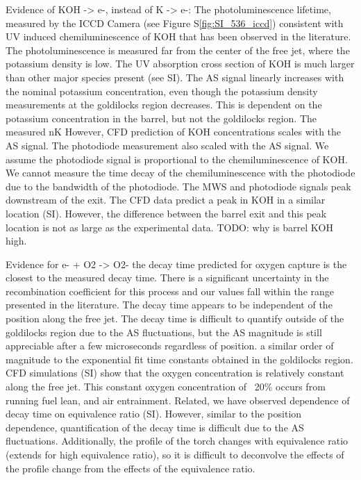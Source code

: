 \begin{outline}
\1 Evidence of KOH -> e-, instead of K -> e-:
    \2 The photoluminescence lifetime, measured by the ICCD Camera (see Figure S\ref*{fig:SI_536_iccd}) consistent with UV induced chemiluminescence of KOH that has been observed in the literature. The photoluminescence is measured far from the center of the free jet, where the potassium density is low.
    \2 The UV absorption cross section of KOH is much larger than other major species present (see SI).
    \2 The AS signal linearly increases with the nominal potassium concentration, even though the potassium density measurements at the goldilocks region decreases. This   is dependent on the potassium concentration in the barrel, but not the goldilocks region. The measured nK However, CFD prediction of KOH concentrations scales with the AS signal. The photodiode measurement also scaled with the AS signal. We assume the photodiode signal is proportional to the chemiluminescence of KOH. We cannot measure the time decay of the chemiluminescence with the photodiode due to the bandwidth of the photodiode.
    \2 The MWS and photodiode signals peak downstream of the exit. The CFD data predict a peak in KOH in a similar location (SI). However, the difference between the barrel exit and this peak location is not as large as the experimental data. TODO: why is barrel KOH high. 

\1 Evidence for e- + O2 -> O2-
    \2 the decay time predicted for oxygen capture is the closest to the measured decay time. There is a significant uncertainty in the recombination coefficient for this process and our values fall within the range presented in the literature. 
    \2 The decay time appears to be independent of the position along the free jet. The decay time is difficult to quantify outside of the goldilocks region due to the AS fluctuations, but the AS magnitude is still appreciable after a few microseconds regardless of position. a similar order of magnitude to the exponential fit time constants obtained in the goldilocks region. CFD simulations (SI) show that the oxygen concentration is relatively constant along the free jet. This constant oxygen concentration of ~20\% occurs from running fuel lean, and air entrainment. 
    \2 Related, we have observed dependence of decay time on equivalence ratio (SI). However, similar to the position dependence, quantification of the decay time is difficult due to the AS fluctuations. Additionally, the profile of the torch changes with equivalence ratio (extends for high equivalence ratio), so it is difficult to deconvolve the effects of the profile change from the effects of the equivalence ratio.

\end{outline}



